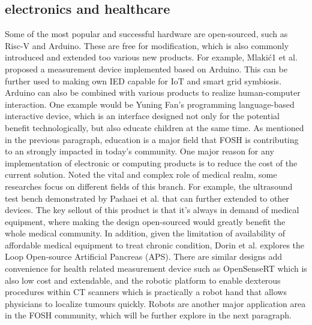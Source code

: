 \documentclass[acmtog]{acmart}
\begin{document}
\subsection{electronics and healthcare}
Some of the most popular and successful hardware are open-sourced, such as Risc-V and Arduino. These are free for modification, which is also commonly introduced and extended too various new products. For example, Mlakić1 et al. proposed a measurement device implemented based on Arduino. This can be further used to making own IED capable for IoT and smart grid symbiosis. 
Arduino can also be combined with various products to realize human-computer interaction. One example would be Yuning Fan's programming language-based interactive device, which is an interface designed not only for the potential benefit technologically, but also educate children at the same time. As mentioned in the previous paragraph, education is a major field that FOSH is contributing to an strongly impacted in today's community.  
One major reason for any implementation of electronic or computing products is to reduce the cost of the current solution. Noted the vital and complex role of medical realm, some researches  focus on different fields of this branch. For example, the ultrasound test bench demonstrated by Pashaei et al. that can further extended to other devices. The key sellout of this product is that it's always in demand of medical equipment, where making the design open-sourced would greatly benefit the whole medical community. 
In addition, given the limitation of availability of affordable medical equipment to treat chronic condition, Dorin et al. explores the Loop Open-source Artificial Pancreas (APS).
There are similar designs add convenience for health related measurement device such as OpenSenseRT which is also low cost and extendable,
and the robotic platform to enable dexterous procedures within CT scanners which is practically a robot hand that allows physicians to localize tumours quickly. Robots are another major application area in the FOSH community, which will be further explore in the next paragraph. 
\end{document}
